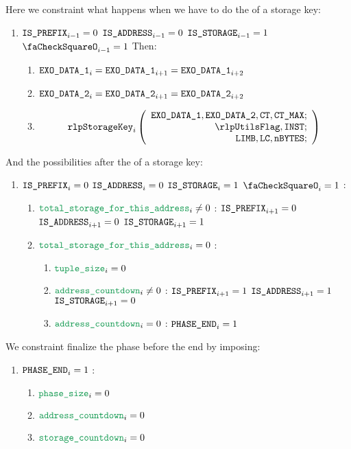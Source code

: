 \begin{enumerate}[resume]
		Here we constraint what happens when we have to do the \rlp{} of a storage key:
		\begin{enumerate}[resume]
			\item \If $\texttt{IS\_PREFIX}_{i-1} = 0$ \et $\texttt{IS\_ADDRESS}_{i-1} = 0$ \et $\texttt{IS\_STORAGE}_{i-1} = 1$ \et $\done_{i-1} =1$ Then:
				\begin{enumerate}
					\item $\texttt{EXO\_DATA\_1}_{i} = \texttt{EXO\_DATA\_1}_{i+1} = \texttt{EXO\_DATA\_1}_{i+2}$
					\item $\texttt{EXO\_DATA\_2}_{i} = \texttt{EXO\_DATA\_2}_{i+1} = \texttt{EXO\_DATA\_2}_{i+2}$
					\item \[
							\rlpStorageKey_{i}
							\left(
							\begin{array}{r}
								\exoDataColumn{1},
								\exoDataColumn{2},
								\ct,
								\maxCt; \\
								\rlpUtilsFlag,
								\INST; \\
								\limb,
								\lc,
								\limbsize; \\
							\end{array}
							\right)
						\]
				\end{enumerate}
		\end{enumerate}
		And the possibilities after the \rlp{} of a storage key:
		\begin{enumerate}[resume]
			\item \If $\texttt{IS\_PREFIX}_{i} = 0$ \et $\texttt{IS\_ADDRESS}_{i} = 0$ \et $\texttt{IS\_STORAGE}_{i} = 1$ \et $\done_{i} =1$ \Then:
				\begin{enumerate}
					\item \If $\locTotStorageForThisAddress_{i} \neq 0$ \Then: $\texttt{IS\_PREFIX}_{i+1} = 0$ \et $\texttt{IS\_ADDRESS}_{i+1} = 0$ \et $\texttt{IS\_STORAGE}_{i+1} = 1$
					\item \If $\locTotStorageForThisAddress_{i} = 0$ \Then:
						\begin{enumerate}
							\item $\locAccessListTupleSize_{i} = 0$
							\item \If $\locAddressPrewarmingCountdown_{i} \neq 0$ \Then: $\texttt{IS\_PREFIX}_{i+1} = 1$ \et $\texttt{IS\_ADDRESS}_{i+1} = 1$ \et $\texttt{IS\_STORAGE}_{i+1} = 0$
							\item \If $\locAddressPrewarmingCountdown_{i} = 0$ \Then: $\texttt{PHASE\_END}_{i} =1$
						\end{enumerate}
				\end{enumerate}
		\end{enumerate}

		We constraint finalize the phase before the end by imposing:
		\begin{enumerate}
			\item \If $\texttt{PHASE\_END}_{i} =1$ \Then:
				\begin{enumerate}
					\item $\locPhaseSize_{i} =0$
					\item $\locAddressPrewarmingCountdown_{i} =0$
					\item $\locStoragePrewarmingCountdown_{i} =0$
				\end{enumerate}
		\end{enumerate}


\end{enumerate}
